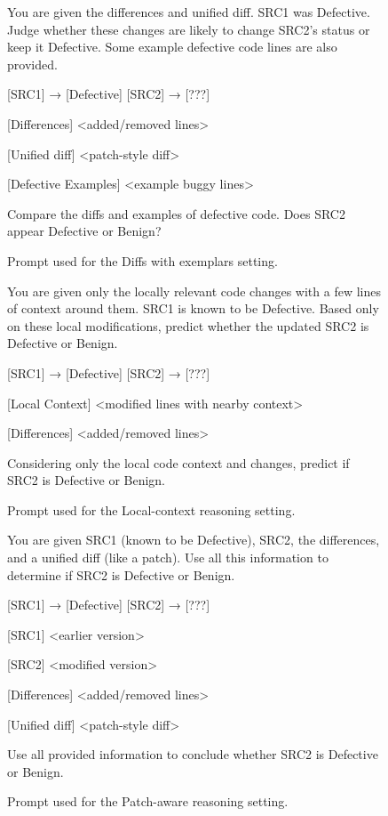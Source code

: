 \documentclass[authoryear,final,5p,times,twocolumn]{elsarticle}
\theoremstyle{plain}
\begin{document}
\begin{figure}[ht]
\centering
\begin{promptbox}
You are given the differences and unified diff. SRC1 was Defective. Judge whether these changes are likely to change SRC2's status or keep it Defective. Some example defective code lines are also provided.

[SRC1] → [Defective]
[SRC2] → [???]

[Differences]
\textless added/removed lines\textgreater

[Unified diff]
\textless patch-style diff\textgreater

[Defective Examples]
\textless example buggy lines\textgreater

Compare the diffs and examples of defective code. Does SRC2 appear Defective or Benign?
\end{promptbox}
\caption{Prompt used for the Diffs with exemplars setting.}
\label{fig:prompt_m7}
\end{figure}

\begin{figure}[ht]
\centering
\begin{promptbox}
You are given only the locally relevant code changes with a few lines of context around them. SRC1 is known to be Defective. Based only on these local modifications, predict whether the updated SRC2 is Defective or Benign.

[SRC1] → [Defective]
[SRC2] → [???]

[Local Context]
\textless modified lines with nearby context\textgreater

[Differences]
\textless added/removed lines\textgreater

Considering only the local code context and changes, predict if SRC2 is Defective or Benign.
\end{promptbox}
\caption{Prompt used for the Local-context reasoning setting.}
\label{fig:prompt_m6}
\end{figure}

\begin{figure}[ht]
\centering
\begin{promptbox}
You are given SRC1 (known to be Defective), SRC2, the differences, and a unified diff (like a patch). Use all this information to determine if SRC2 is Defective or Benign.

[SRC1] → [Defective]
[SRC2] → [???]

[SRC1]
\textless earlier version\textgreater

[SRC2]
\textless modified version\textgreater

[Differences]
\textless added/removed lines\textgreater

[Unified diff]
\textless patch-style diff\textgreater

Use all provided information to conclude whether SRC2 is Defective or Benign.
\end{promptbox}
\caption{Prompt used for the Patch-aware reasoning setting.}
\label{fig:prompt_m3}
\end{figure}
\end{document}
